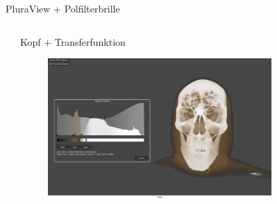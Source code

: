 \documentclass[final,hyperref={pdfpagelabels=false}]{beamer}
\begin{document}
\begin{frame}[t]
\begin{columns}[t]
\begin{column}{0.465\textwidth}
\begin{block}{PluraView + Polfilterbrille}

\end{block}



\end{column} %



\begin{column}{.025\textwidth}\end{column} %

\end{columns} %

\begin{columns}[t] %

\begin{column}{.025\textwidth}\end{column} %

\begin{column}{.465\textwidth} %


\begin{block}{Kopf + Transferfunktion}
    \begin{figure}
    	\center
        \includegraphics[width=0.8\textwidth]{KopfTransferfunktion}
        
    \end{figure}


\end{block}
\end{column}
\end{columns}
\end{frame}
\end{document}
